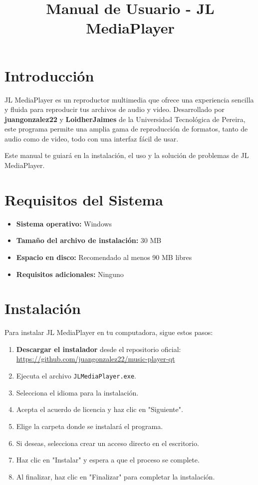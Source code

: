 \documentclass[a4paper,12pt]{article}
\title{Manual de Usuario - JL MediaPlayer}
\author{}
\date{}
\begin{document}
\maketitle

\section*{Introducción}

JL MediaPlayer es un reproductor multimedia que ofrece una experiencia sencilla y fluida para reproducir tus archivos de audio y video. Desarrollado por \textbf{juangonzalez22} y \textbf{LoidherJaimes} de la Universidad Tecnológica de Pereira, este programa permite una amplia gama de reproducción de formatos, tanto de audio como de video, todo con una interfaz fácil de usar.

Este manual te guiará en la instalación, el uso y la solución de problemas de JL MediaPlayer.

\section*{Requisitos del Sistema}

\begin{itemize}
    \item \textbf{Sistema operativo:} Windows
    \item \textbf{Tamaño del archivo de instalación:} 30 MB
    \item \textbf{Espacio en disco:} Recomendado al menos 90 MB libres
    \item \textbf{Requisitos adicionales:} Ninguno
\end{itemize}

\section*{Instalación}

Para instalar JL MediaPlayer en tu computadora, sigue estos pasos:

\begin{enumerate}
    \item \textbf{Descargar el instalador} desde el repositorio oficial: \url{https://github.com/juangonzalez22/music-player-qt}
    \item Ejecuta el archivo \texttt{JLMediaPlayer.exe}.
    \item Selecciona el idioma para la instalación.
    \item Acepta el acuerdo de licencia y haz clic en "Siguiente".
    \item Elige la carpeta donde se instalará el programa.
    \item Si deseas, selecciona crear un acceso directo en el escritorio.
    \item Haz clic en "Instalar" y espera a que el proceso se complete.
    \item Al finalizar, haz clic en "Finalizar" para completar la instalación.
\end{enumerate}
\end{document}
